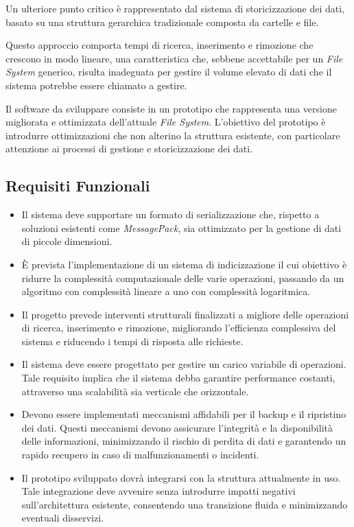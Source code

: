 \documentclass[12pt,a4paper,openright,twoside]{book}
\begin{document}
        Un ulteriore punto critico è rappresentato dal sistema di storicizzazione dei dati, basato su una struttura gerarchica tradizionale composta da cartelle e file.

        \pagebreak

        Questo approccio comporta tempi di ricerca, inserimento e rimozione che crescono in modo lineare, una caratteristica che, sebbene accettabile per un \textit{File System} generico, risulta inadeguata per gestire il volume elevato di dati che il sistema potrebbe essere chiamato a gestire.

        Il software da sviluppare consiste in un prototipo che rappresenta una versione migliorata e ottimizzata dell'attuale \textit{File System}. L'obiettivo del prototipo è introdurre ottimizzazioni che non alterino la struttura esistente, con particolare attenzione ai processi di gestione e storicizzazione dei dati.

        \subsection{Requisiti Funzionali}

            \begin{itemize}
                \item Il sistema deve supportare un formato di serializzazione che, rispetto a soluzioni esistenti come \textit{MessagePack}, sia ottimizzato per la gestione di dati di piccole dimensioni.
                \item È prevista l’implementazione di un sistema di indicizzazione il cui obiettivo è ridurre la complessità computazionale delle varie operazioni, passando da un algoritmo con complessità lineare a uno con complessità logaritmica.
                \item Il progetto prevede interventi strutturali finalizzati a migliore delle operazioni di ricerca, inserimento e rimozione, migliorando l’efficienza complessiva del sistema e riducendo i tempi di risposta alle richieste.
                \item Il sistema deve essere progettato per gestire un carico variabile di operazioni. Tale requisito implica che il sistema debba garantire performance costanti, attraverso una scalabilità sia verticale che orizzontale.
                \item Devono essere implementati meccanismi affidabili per il backup e il ripristino dei dati. Questi meccanismi devono assicurare l’integrità e la disponibilità delle informazioni, minimizzando il rischio di perdita di dati e garantendo un rapido recupero in caso di malfunzionamenti o incidenti.
                \item Il prototipo sviluppato dovrà integrarsi con la struttura attualmente in uso. Tale integrazione deve avvenire senza introdurre impatti negativi sull’architettura esistente, consentendo una transizione fluida e minimizzando eventuali disservizi.
            \end{itemize}
\end{document}
